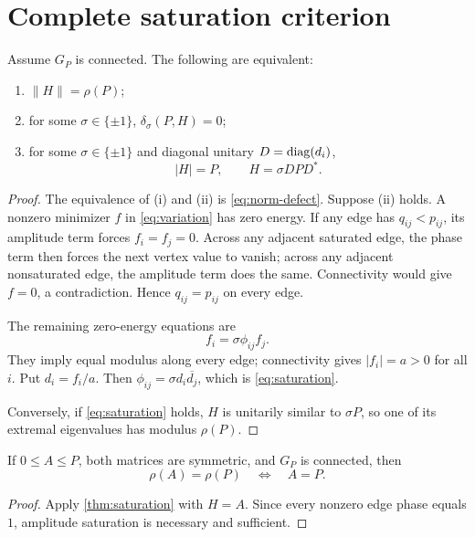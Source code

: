 \section{Complete saturation criterion}
\label{sec:equality}

\begin{theorem}\label{thm:saturation}
Assume \(G_P\) is connected.  The following are equivalent:
\begin{enumerate}[label=(\roman*),leftmargin=2.4em]
\item \(\|H\|=\rho(P)\);
\item for some \(\sigma\in\{\pm1\}\),
\(\delta_\sigma(P,H)=0\);
\item for some \(\sigma\in\{\pm1\}\) and diagonal unitary
\(D=\operatorname{diag}(d_i)\),
\begin{equation}\label{eq:saturation}
 |H|=P,
 \qquad
 H=\sigma DPD^*.
\end{equation}
\end{enumerate}
\end{theorem}

\begin{proof}
The equivalence of (i) and (ii) is \eqref{eq:norm-defect}.
Suppose (ii) holds.  A nonzero minimizer \(f\) in
\eqref{eq:variation} has zero energy.  If any edge has
\(q_{ij}<p_{ij}\), its amplitude term forces \(f_i=f_j=0\).
Across any adjacent saturated edge, the phase term then forces the next
vertex value to vanish; across any adjacent nonsaturated edge, the
amplitude term does the same.  Connectivity would give \(f=0\), a
contradiction.  Hence \(q_{ij}=p_{ij}\) on every edge.

The remaining zero-energy equations are
\[
 f_i=\sigma\phi_{ij}f_j.
\]
They imply equal modulus along every edge; connectivity gives
\(|f_i|=a>0\) for all \(i\).  Put \(d_i=f_i/a\).  Then
\(\phi_{ij}=\sigma d_i\overline{d_j}\), which is
\eqref{eq:saturation}.

Conversely, if \eqref{eq:saturation} holds, \(H\) is unitarily similar
to \(\sigma P\), so one of its extremal eigenvalues has modulus
\(\rho(P)\).
\end{proof}

\begin{corollary}\label{cor:nonnegative}
If \(0\le A\le P\), both matrices are symmetric, and \(G_P\) is
connected, then
\[
 \rho(A)=\rho(P)
 \quad\Longleftrightarrow\quad
 A=P.
\]
\end{corollary}

\begin{proof}
Apply \cref{thm:saturation} with \(H=A\).  Since every nonzero edge
phase equals \(1\), amplitude saturation is necessary and sufficient.
\end{proof}

